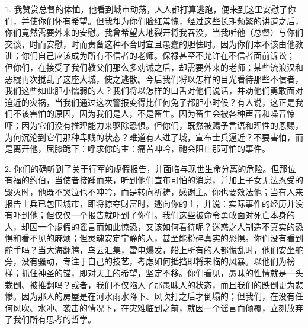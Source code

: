 \par

1. 我赞赏总督的体恤，他看到城市动荡，人人都打算逃跑，便来到这里安慰了你们，并使你们怀有希望。但我却为你们脸红羞愧，经过这些长期频繁的讲道之后，你们竟然需要外来的安慰。我曾希望大地裂开将我吞没，当我听他（总督）与你们交谈，时而安慰，时而责备这种不合时宜且愚蠢的胆怯时。因为你们本不该由他教训；你们自己应该成为所有不信者的老师。保禄甚至不允许在不信者面前诉讼； 但你们，在接受了我们教父们那么多劝诫之后，却需要外来的老师；某些流浪汉和恶棍再次搅乱了这座大城，使之逃散。今后我们将以怎样的目光看待那些不信者，我们这些如此胆小懦弱的人？我们将以怎样的口舌对他们说话，并劝他们勇敢面对迫近的灾祸，当我们通过这次警报变得比任何兔子都胆小时候？有人说，这正是我们不该害怕的原因，因为我们是人，不是畜生。因为畜生会被各种声音和噪音惊吓；因为它们没有推理能力来驱除恐惧。但你们，既然被赐予言语和理性的恩赐，为何沉沦到它们那种卑贱的状态？难道有人进了城，宣布士兵逼近？不要害怕，而是离开他，屈膝跪下：呼求你的主：痛苦呻吟，祂会阻止那可怕的事件。\par

2. 你们的确听到了关于行军的虚假报告，并面临与现世生命分离的危险。但那位有福的约伯，当使者接踵而来，听到他们宣布可怕的消息，并加上子女无法忍受的毁灭时，他既不哭泣也不呻吟，而是转向祈祷，感谢主。你也要效法他；当有人来报告士兵已包围城市，即将掠夺财富时，逃向你的主，并说：实际事件的经历并没有吓到他；但仅仅一个报告就吓到了你们。我们这些被命令勇敢面对死亡本身的人，却因一个虚假的谣言而如此惊恐，又该如何看待呢？迷惑之人制造不真实的恐惧和看不见的麻烦；但灵魂安定宁静的人，甚至能粉碎真实的恐惧。你们没有看到舵手吗？当大海翻腾，乌云汇集，雷电爆发，船上所有的人都慌乱时，他们安坐舵旁，没有骚动，专注于自己的技艺，考虑如何抵挡即将来临的风暴。以他们为榜样；抓住神圣的锚，即对天主的希望，坚定不移。你们看见，愚昧的性情就是一头栽倒、被推翻吗？或者，我们不仅陷入了那愚昧人的状态，而且我们的跌倒更为悲惨。因为那人的房屋是在河水雨水降下、风吹打之后才倒塌的；但我们，在没有任何风吹、水冲、袭击的情况下，在灾难临到之前，就因一个谣言而倾覆，立刻放弃了我们所有思考的哲学。\par

